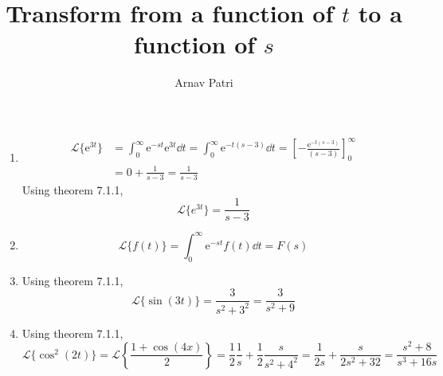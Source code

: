 \documentclass[12pt]{article}
\title{Transform from a function of \(t\) to a function of \(s\)}
\author{Arnav Patri}
\newcommand{\Ell}{\mathscr{L}}
\newcommand{\en}{\text{e}}
\begin{document}
	\maketitle
	\thispagestyle{empty}
	\begin{enumerate}[1)]
		\item
			\begin{align*}
				\Ell\{\en^{3t}\} &= \int_0^\infty \en^{-st}\en^{3t}\dd{t}
						= \int_0^\infty \en^{-t(s - 3)}\dd{t} 
						= \left[-\frac{\en^{-t(s - 3)}}{(s - 3)}\right]_0^\infty \\
					&= 0 + \frac{1}{s - 3}
						= \frac{1}{s - 3}
			\end{align*}
			Using theorem 7.1.1,
				\[\Ell\{e^{3t}\} = \frac{1}{s - 3}\]
		\item
			\[\Ell\{f(t)\} = \int_0^\infty \en^{-st}f(t)\dd{t} = F(s)\]
		\item
			Using theorem 7.1.1,
			\[
				\Ell\{\sin(3t)\} = \frac{3}{s^2 + 3^2}
					= \frac{3}{s^2 + 9}
			\]
		\item
			Using theorem 7.1.1,
			\[
				\Ell\{\cos^2(2t)\} = \Ell\left\{\frac{1 + \cos(4x)}{2}\right\}
					= \frac{1}{2}\frac{1}{s} + \frac{1}{2}\frac{s}{s^2 + 4^2}
					= \frac{1}{2s} + \frac{s}{2s^2 + 32}
					= \frac{s^2 + 8}{s^3 + 16s}
			\]
	\end{enumerate}
\end{document}
